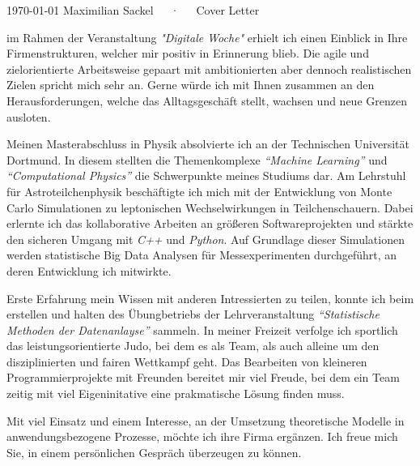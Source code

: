 \documentclass[11pt, a4paper]{Awesome-CV/awesome-cv}
\begin{document}
\makecvheader[R]

\makecvfooter
{\today}
{Maximilian Sackel~~~·~~~Cover Letter}
{}

\makelettertitle

\begin{cvletter}
    im Rahmen der Veranstaltung \textit{"Digitale Woche"} erhielt ich einen Einblick in Ihre Firmenstrukturen,
    welcher mir positiv in Erinnerung blieb.
    Die agile und zielorientierte Arbeitsweise gepaart mit ambitionierten aber
    dennoch realistischen Zielen spricht mich sehr an.
    Gerne würde ich mit Ihnen zusammen an den Herausforderungen,
    welche das Alltagsgeschäft stellt,
    wachsen und neue Grenzen ausloten.

    Meinen Masterabschluss in Physik absolvierte ich an der Technischen Universität Dortmund.
    In diesem stellten die Themenkomplexe \textit{``Machine Learning''}
    und \textit{``Computational Physics''} die Schwerpunkte meines Studiums dar.
    Am Lehrstuhl für Astroteilchenphysik beschäftigte ich mich
    mit der Entwicklung von Monte Carlo Simulationen zu leptonischen Wechselwirkungen
    in Teilchenschauern.
    Dabei erlernte ich das kollaborative Arbeiten an größeren Softwareprojekten
    und stärkte den sicheren Umgang mit \textit{C++} und \textit{Python}.
    Auf Grundlage dieser Simulationen werden statistische Big Data Analysen für
    Messexperimenten durchgeführt,
    an deren Entwicklung ich mitwirkte.

    Erste Erfahrung mein Wissen mit anderen Intressierten zu teilen,
    konnte ich beim erstellen und halten des Übungbetriebs der Lehrveranstaltung
    \textit{``Statistische Methoden der Datenanlayse''} sammeln.
    In meiner Freizeit verfolge ich sportlich das leistungsorientierte Judo,
    bei dem es als Team, als auch alleine um den disziplinierten und fairen
    Wettkampf geht.
    Das Bearbeiten von kleineren Programmierprojekte mit Freunden bereitet mir viel Freude,
    bei dem ein Team zeitig mit viel Eigeninitative eine prakmatische Lösung finden muss.

    Mit viel Einsatz und einem Interesse,
    an der Umsetzung theoretische Modelle in anwendungsbezogene Prozesse,
    möchte ich ihre Firma ergänzen.
    Ich freue mich Sie, in einem persönlichen Gespräch überzeugen zu können.

\end{cvletter}


\makeletterclosing
\end{document}
